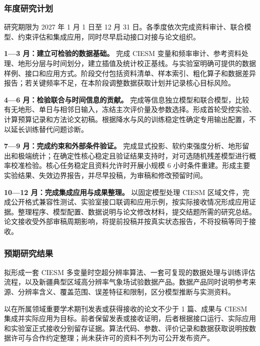 \justifying
\NSFCBodyText

\subsubsection{年度研究计划}

研究期限为 2027 年 1 月 1 日至 12 月 31 日。各季度依次完成资料审计、联合模型、约束评估和集成应用，同时尽早启动接口对接与论文组织。

\textbf{1—3 月：建立可检验的数据基础。}
完成 CIESM 变量和频率审计、参考资料处理、地形分层与时间划分，建立插值及统计校正基线。与实验室明确可提供的数据样例、接口和应用方式。阶段交付包括资料清单、样本索引、粗化算子和数据差异报告；若关键频率不足，在本阶段调整数据获取计划并记录核心目标风险。

\textbf{4—6 月：检验联合与时间信息的贡献。}
完成等信息独立模型和联合模型，比较有无地形、单日与相邻日输入，冻结主次评价量及参数选择。形成首轮受控实验、计算预算记录和方法论文初稿。根据降水与风的训练稳定性确定专用输出配置，不以延长训练替代问题诊断。

\textbf{7—9 月：完成约束和外部条件验证。}
完成显式投影、软约束强度分析、地形留出和极端统计；在确定性核心稳定且验证结果支持时，对可选随机残差模型进行概率校准检验。核心任务稳定且资料允许时开展小规模 6 小时条件重建。形成主要实验结果、失效边界报告，并尽早投稿，为审稿和修改预留时间。

\textbf{10—12 月：完成集成应用与成果整理。}
以固定模型处理 CIESM 区域文件，完成公开格式兼容性测试、实验室接口联调和应用示例，按实际接收情况形成应用证据。整理程序、模型配置、数据说明与论文修改材料，提交结题所需的研究总结。论文接收受外部审稿周期影响，将提前投稿并按真实状态报告，不将投稿等同于接收。

\subsubsection{预期研究结果}

拟形成一套 CIESM 多变量时空超分辨率算法、一套可复现的数据处理与训练评估流程，以及新疆典型区域高分辨率气象场试验数据产品。数据产品同时说明参考来源、分辨率含义、覆盖范围、误差特征和限制，区分模型推断与实测资料。

以在所属领域重要学术期刊发表或获得接收的论文不少于 1 篇、成果与 CIESM 集成并实际应用为目标。前者保留发表或接收证明，后者根据接口运行、实际应用和实验室正式接收分别留存证据。算法代码、参数、评价记录和数据获取说明按数据许可与合作约定整理；尚未获许可的资料不列为可公开发布资产。
